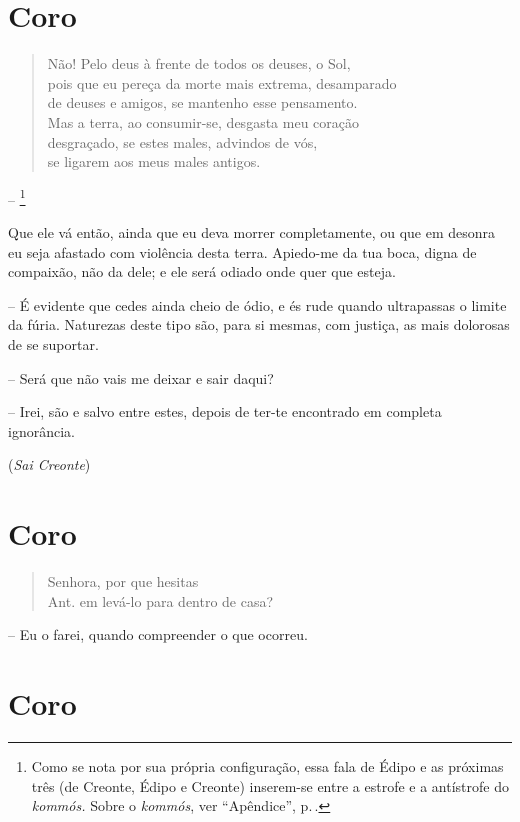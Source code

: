 \section{Coro} 

\begin{verse}Não! Pelo deus à frente de todos os deuses, o Sol, \\
pois que eu pereça da morte mais extrema, desamparado\\
de deuses e amigos, se mantenho esse pensamento.\\
Mas a terra, ao consumir-se, desgasta meu coração\\
desgraçado, se estes males, advindos de vós,\\
se ligarem aos meus males antigos.
\end{verse}

 -- \footnote{Como se nota por sua própria configuração, essa
  fala de Édipo e as próximas três (de Creonte, Édipo e Creonte)
  inserem-se entre a estrofe e a antístrofe do \emph{kommós.} Sobre o
  \emph{kommós}, ver ``Apêndice'', p.\,\pageref{resumo}.}

Que ele vá então, ainda que eu deva morrer completamente, ou que em
desonra  eu seja afastado com violência desta terra. Apiedo-me da
tua boca, digna de compaixão, não da dele; e ele será odiado onde quer
que esteja.

 --   É evidente que cedes ainda cheio de ódio, e és rude quando ultrapassas o
limite da fúria. Naturezas deste tipo são, para si mesmas, com justiça,
as mais dolorosas de se suportar.

 --   Será que não vais me deixar e sair daqui?

 --   Irei, são e salvo entre estes, depois de ter-te encontrado em completa
ignorância.

(\emph{Sai Creonte})


\section{Coro} 

\begin{verse}Senhora, por que hesitas\\ Ant.
em levá-lo para dentro de casa?
\end{verse}

 --   Eu o farei, quando compreender o que ocorreu. 


\section{Coro} 

